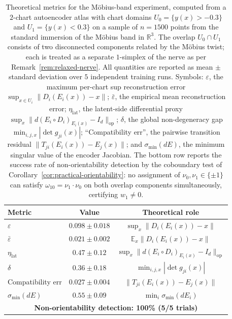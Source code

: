 \documentclass[11pt]{article}
\newcommand{\R}{\mathbb{R}}
\theoremstyle{plain}
\theoremstyle{definition}
\theoremstyle{remark}
\begin{document}
\begin{table}[ht]
\centering
\caption{Theoretical metrics for the M\"obius-band experiment,
computed from a $2$-chart autoencoder atlas with chart domains
$U_0=\{y(x)>-0.3\}$ and $U_1=\{y(x)<0.3\}$ on a sample of $n=1500$
points from the standard immersion of the M\"obius band in $\R^3$.
The overlap $U_0\cap U_1$ consists of two disconnected components
related by the M\"obius twist; each is treated as a separate
$1$-simplex of the nerve as per Remark~\ref{rem:relaxed-nerve}.
All quantities are reported as mean $\pm$ standard deviation over
$5$ independent training runs.
Symbols: $\varepsilon$, the maximum per-chart sup reconstruction error
$\sup_{x\in U_i}\|D_i(E_i(x))-x\|$; $\bar\varepsilon$, the empirical mean
reconstruction error; $\eta_{\mathrm{lat}}$, the latent-side
differential proxy $\sup_x\|d(E_i\circ D_i)_{E_i(x)}-I_d\|_{\mathrm{op}}$;
$\delta$, the global non-degeneracy gap
$\min_{i,j,x}|\det g_{ji}(x)|$; ``Compatibility err'', the pairwise
transition residual $\|T_{ji}(E_i(x))-E_j(x)\|$; and $\sigma_{\min}(dE)$,
the minimum singular value of the encoder Jacobian. The bottom row
reports the success rate of non-orientability detection by the
coboundary test of Corollary~\ref{cor:practical-orientability}:
no assignment of $\nu_0,\nu_1\in\{\pm 1\}$ can satisfy
$\omega_{10}=\nu_1\cdot\nu_0$ on both overlap components
simultaneously, certifying $w_1\neq 0$.}
\label{tab:mobius_metrics}
\begin{tabular}{lcc}
\toprule
Metric & Value & Theoretical role \\
\midrule
$\varepsilon$            & $0.098 \pm 0.018$ & $\sup_x \|D_i(E_i(x)) - x\|$ \\
$\bar\varepsilon$        & $0.021 \pm 0.002$ & $\mathbb{E}_x \|D_i(E_i(x)) - x\|$ \\
$\eta_{\mathrm{lat}}$    & $0.47  \pm 0.12$  & $\sup_x \|d(E_i \circ D_i)_{E_i(x)} - I_d\|_{\mathrm{op}}$ \\
$\delta$                 & $0.36  \pm 0.18$  & $\min_{i,j,x} |\det g_{ji}(x)|$ \\
Compatibility err        & $0.027 \pm 0.004$ & $\|T_{ji}(E_i(x)) - E_j(x)\|$ \\
$\sigma_{\min}(dE)$      & $0.55  \pm 0.09$  & $\min_i \sigma_{\min}(dE_i)$ \\
\midrule
\multicolumn{3}{c}{\textbf{Non-orientability detection: 100\% (5/5 trials)}} \\
\bottomrule
\end{tabular}
\end{table}
\end{document}

